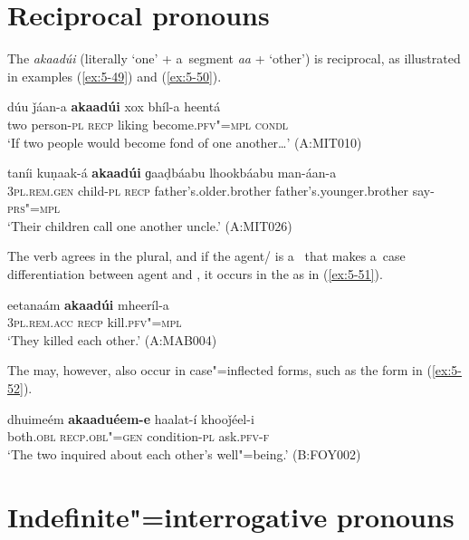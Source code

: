 \section{Reciprocal pronouns}
\label{sec:5-6}

The  \textit{akaadúi} (literally `one' + a~segment \textit{aa} + `other') is reciprocal,
as illustrated in examples (\ref{ex:5-49}) and (\ref{ex:5-50}).

\ea 
\label{ex:5-49}
\gll dúu ǰáan-a \textbf{akaadúi} xox bhíl-a heentá\\
two person-\textsc{pl} \textsc{recp} liking become.\textsc{pfv"=mpl} \textsc{condl}\\
\glt `If two people would become fond of one another{\ldots}' (A:MIT010)

\ex
\label{ex:5-50}
\gll taníi kuṇaak-á \textbf{akaadúi} ɡaaḍbáabu lhookbáabu man-áan-a\\
\textsc{3pl.rem.gen} child-\textsc{pl} \textsc{recp} father's.older.brother father's.younger.brother say-\textsc{prs"=mpl} \\
\glt `Their children call one another uncle.' (A:MIT026)
\z

The  verb agrees in the plural, and if the agent/ is a~ that makes a~case differentiation between agent and , it occurs in the  as in (\ref{ex:5-51}).
\begin{exe}
\ex
\label{ex:5-51}
\gll eetanaám \textbf{akaadúi} mheeríl-a\\
\textsc{3pl.rem.acc} \textsc{recp } kill.\textsc{pfv"=mpl}\\
\glt `They killed each other.' (A:MAB004)
\end{exe}

The  may, however, also occur in case"=inflected forms, such as the  form in (\ref{ex:5-52}). 
\begin{exe}
\ex
\label{ex:5-52}
\gll dhuimeém \textbf{akaaduéem-e} haalat-í khooǰéel-i\\
both.\textsc{obl} \textsc{recp.obl"=gen } condition-\textsc{pl} ask.\textsc{pfv-f}\\
\glt `The two inquired about each other's well"=being.' (B:FOY002)
\end{exe}

\section{Indefinite"=interrogative pronouns}
\label{sec:5-7}


